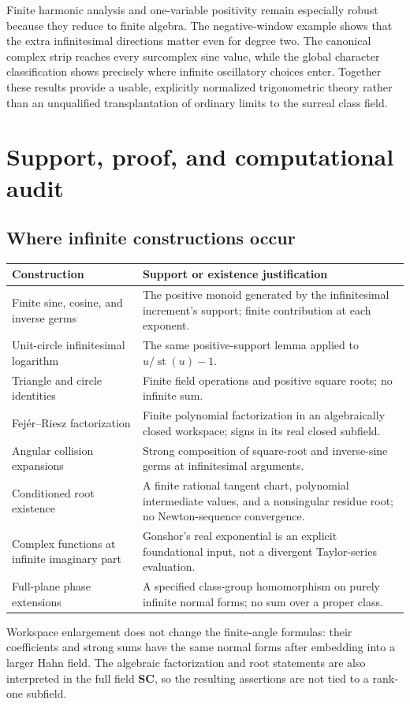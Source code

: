 \documentclass[11pt,letterpaper]{article}
\theoremstyle{definition}
\theoremstyle{remark}
\newcommand{\SC}{\mathbf{SC}}
\newcommand{\st}{\operatorname{st}}
\numberwithin{equation}{section}
\begin{document}
Finite harmonic analysis and one-variable positivity remain especially robust because they reduce to finite algebra. The negative-window example shows that the extra infinitesimal directions matter even for degree two. The canonical complex strip reaches every surcomplex sine value, while the global character classification shows precisely where infinite oscillatory choices enter. Together these results provide a usable, explicitly normalized trigonometric theory rather than an unqualified transplantation of ordinary limits to the surreal class field.

\appendix
\section{Support, proof, and computational audit}\label{app:audit}
\subsection{Where infinite constructions occur}
\begin{center}\small
\begin{longtable}{@{}L{0.32\textwidth}L{0.55\textwidth}@{}}
\toprule
Construction & Support or existence justification\\
\midrule\endhead
Finite sine, cosine, and inverse germs & The positive monoid generated by the infinitesimal increment's support; finite contribution at each exponent.\\[0.35em]
Unit-circle infinitesimal logarithm & The same positive-support lemma applied to $u/\st(u)-1$.\\[0.35em]
Triangle and circle identities & Finite field operations and positive square roots; no infinite sum.\\[0.35em]
Fej\'er--Riesz factorization & Finite polynomial factorization in an algebraically closed workspace; signs in its real closed subfield.\\[0.35em]
Angular collision expansions & Strong composition of square-root and inverse-sine germs at infinitesimal arguments.\\[0.35em]
Conditioned root existence & A finite rational tangent chart, polynomial intermediate values, and a nonsingular residue root; no Newton-sequence convergence.\\[0.35em]
Complex functions at infinite imaginary part & Gonshor's real exponential is an explicit foundational input, not a divergent Taylor-series evaluation.\\[0.35em]
Full-plane phase extensions & A specified class-group homomorphism on purely infinite normal forms; no sum over a proper class.\\
\bottomrule
\end{longtable}
\end{center}
Workspace enlargement does not change the finite-angle formulas: their coefficients and strong sums have the same normal forms after embedding into a larger Hahn field. The algebraic factorization and root statements are also interpreted in the full field $\SC$, so the resulting assertions are not tied to a rank-one subfield.
\end{document}
